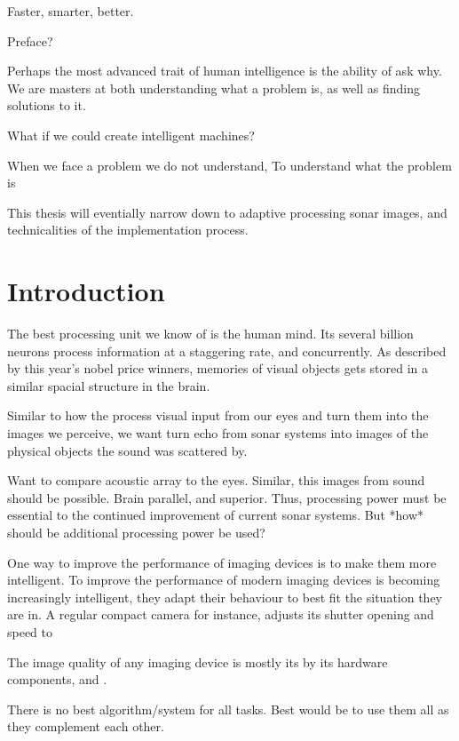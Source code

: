 Faster, smarter, better.





Preface?


Perhaps the most advanced trait of human intelligence is the ability of ask why. We are masters at both understanding what a problem is, as well as finding solutions to it. 

What if we could create intelligent machines? 

When we face a problem we do not understand, To understand what the problem is

This thesis will eventially narrow down to adaptive processing sonar images, and technicalities of the implementation process.


\chapter{Introduction}






The best processing unit we know of is the human mind. Its several billion neurons process information at a staggering rate, and concurrently. As described by this year's nobel price winners, memories of visual objects gets stored in a similar spacial structure in the brain.  

Similar to how the process visual input from our eyes and turn them into the images we perceive, we want turn echo from sonar systems into images of the physical objects the sound was scattered by. 

Want to compare acoustic array to the eyes. Similar, this images from sound should be possible. Brain parallel, and superior. Thus, processing power must be essential to the continued improvement of current sonar systems. But *how* should be additional processing power be used?

One way to improve the performance of imaging devices is to make them more intelligent. 
To improve the performance of modern imaging devices is becoming increasingly intelligent, they adapt their behaviour to best fit the situation they are in. A regular compact camera for instance, adjusts its shutter opening and speed to 

The image quality of any imaging device is mostly its by its hardware components, and .

There is no best algorithm/system for all tasks. Best would be to use them all as they complement each other. 

